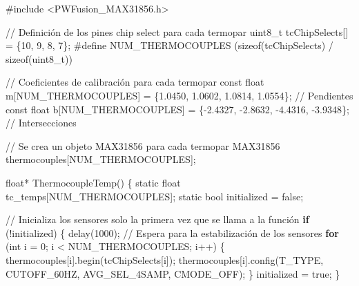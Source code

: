 \documentclass[
  letterpaper,
]{scrbook}
\newenvironment{Shaded}{\begin{snugshade}}{\end{snugshade}}
\newcommand{\BuiltInTok}[1]{\textcolor[rgb]{0.00,0.23,0.31}{#1}}
\newcommand{\CommentTok}[1]{\textcolor[rgb]{0.37,0.37,0.37}{#1}}
\newcommand{\ControlFlowTok}[1]{\textcolor[rgb]{0.00,0.23,0.31}{\textbf{#1}}}
\newcommand{\DecValTok}[1]{\textcolor[rgb]{0.68,0.00,0.00}{#1}}
\newcommand{\FloatTok}[1]{\textcolor[rgb]{0.68,0.00,0.00}{#1}}
\newcommand{\NormalTok}[1]{\textcolor[rgb]{0.00,0.23,0.31}{#1}}
\newcommand{\OperatorTok}[1]{\textcolor[rgb]{0.37,0.37,0.37}{#1}}
\begin{document}
\begin{Shaded}
\begin{Highlighting}[]
\CommentTok{\#include \textless{}PWFusion\_MAX31856.h\textgreater{}}

\OperatorTok{//}\NormalTok{ Definición de los pines chip select para cada termopar}
\NormalTok{uint8\_t tcChipSelects[] }\OperatorTok{=}\NormalTok{ \{}\DecValTok{10}\NormalTok{, }\DecValTok{9}\NormalTok{, }\DecValTok{8}\NormalTok{, }\DecValTok{7}\NormalTok{\}}\OperatorTok{;}
\CommentTok{\#define NUM\_THERMOCOUPLES   (sizeof(tcChipSelects) / sizeof(uint8\_t))}

\OperatorTok{//}\NormalTok{ Coeficientes de calibración para cada termopar}
\NormalTok{const }\BuiltInTok{float}\NormalTok{ m[NUM\_THERMOCOUPLES] }\OperatorTok{=}\NormalTok{ \{}\FloatTok{1.0450}\NormalTok{, }\FloatTok{1.0602}\NormalTok{, }\FloatTok{1.0814}\NormalTok{, }\FloatTok{1.0554}\NormalTok{\}}\OperatorTok{;}  \OperatorTok{//}\NormalTok{ Pendientes}
\NormalTok{const }\BuiltInTok{float}\NormalTok{ b[NUM\_THERMOCOUPLES] }\OperatorTok{=}\NormalTok{ \{}\OperatorTok{{-}}\FloatTok{2.4327}\NormalTok{, }\OperatorTok{{-}}\FloatTok{2.8632}\NormalTok{, }\OperatorTok{{-}}\FloatTok{4.4316}\NormalTok{, }\OperatorTok{{-}}\FloatTok{3.9348}\NormalTok{\}}\OperatorTok{;}  \OperatorTok{//}\NormalTok{ Intersecciones}

\OperatorTok{//}\NormalTok{ Se crea un objeto MAX31856 para cada termopar}
\NormalTok{MAX31856 thermocouples[NUM\_THERMOCOUPLES]}\OperatorTok{;}

\BuiltInTok{float}\OperatorTok{*}\NormalTok{ ThermocoupleTemp() \{}
\NormalTok{  static }\BuiltInTok{float}\NormalTok{ tc\_temps[NUM\_THERMOCOUPLES]}\OperatorTok{;}
\NormalTok{  static }\BuiltInTok{bool}\NormalTok{ initialized }\OperatorTok{=}\NormalTok{ false}\OperatorTok{;}

  \OperatorTok{//}\NormalTok{ Inicializa los sensores solo la primera vez que se llama a la función}
  \ControlFlowTok{if}\NormalTok{ (}\OperatorTok{!}\NormalTok{initialized) \{}
\NormalTok{    delay(}\DecValTok{1000}\NormalTok{)}\OperatorTok{;}  \OperatorTok{//}\NormalTok{ Espera para la estabilización de los sensores}
    \ControlFlowTok{for}\NormalTok{ (}\BuiltInTok{int}\NormalTok{ i }\OperatorTok{=} \DecValTok{0}\OperatorTok{;}\NormalTok{ i }\OperatorTok{\textless{}}\NormalTok{ NUM\_THERMOCOUPLES}\OperatorTok{;}\NormalTok{ i}\OperatorTok{++}\NormalTok{) \{}
\NormalTok{      thermocouples[i].begin(tcChipSelects[i])}\OperatorTok{;}
\NormalTok{      thermocouples[i].config(T\_TYPE, CUTOFF\_60HZ, AVG\_SEL\_4SAMP, CMODE\_OFF)}\OperatorTok{;}
\NormalTok{    \}}
\NormalTok{    initialized }\OperatorTok{=}\NormalTok{ true}\OperatorTok{;}
\NormalTok{  \}}
  

\end{Highlighting}
\end{Shaded}
\end{document}
